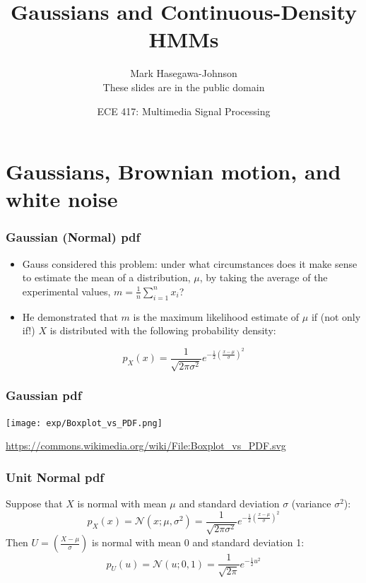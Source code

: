 \documentclass{beamer}
\title{Gaussians and Continuous-Density HMMs}
\author{Mark Hasegawa-Johnson\\These slides are in the public domain}
\date{ECE 417: Multimedia Signal Processing}
\begin{document}
\begin{frame}
  \maketitle
\end{frame}

\begin{frame}
  \tableofcontents
\end{frame}

\section[Gaussians]{Gaussians, Brownian motion, and white noise}
\setcounter{subsection}{1}

\begin{frame}
  \frametitle{Gaussian (Normal) pdf}

  \begin{itemize}
  \item Gauss considered this problem: under what circumstances does
    it make sense to estimate the mean of a distribution, $\mu$, by
    taking the average of the experimental values,
    $m=\frac{1}{n}\sum_{i=1}^nx_i$?
  \item He demonstrated that $m$ is the maximum likelihood estimate of
    $\mu$ if (not only if!) $X$ is distributed with the following
    probability density:
  \end{itemize}
  \begin{displaymath}
    p_X(x)=\frac{1}{\sqrt{2\pi\sigma^2}}e^{-\frac{1}{2}\left(\frac{x-\mu}{\sigma}\right)^2}
  \end{displaymath}
\end{frame}


\begin{frame}
  \frametitle{Gaussian pdf}
  \centerline{\texttt{[image: exp/Boxplot\_vs\_PDF.png]}}
  \url{https://commons.wikimedia.org/wiki/File:Boxplot_vs_PDF.svg}
\end{frame}

\begin{frame}
  \frametitle{Unit Normal pdf}

  Suppose that $X$ is normal with mean $\mu$ and standard deviation
  $\sigma$ (variance $\sigma^2$):
  \begin{displaymath}
    p_X(x) = \mathcal{N}(x;\mu,\sigma^2)=
    \frac{1}{\sqrt{2\pi\sigma^2}}e^{-\frac{1}{2}\left(\frac{x-\mu}{\sigma}\right)^2}
  \end{displaymath}
  Then $U=\left(\frac{X-\mu}{\sigma}\right)$ is normal with mean 0 and
  standard deviation 1:
  \begin{displaymath}
    p_U(u) = \mathcal{N}(u;0,1)=
    \frac{1}{\sqrt{2\pi}}e^{-\frac{1}{2}u^2}
  \end{displaymath}
\end{frame}
  
\end{document}
